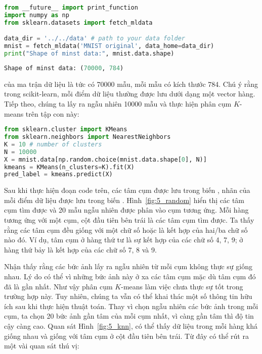 \begin{lstlisting}[language=Python]
from __future__ import print_function 
import numpy as np 
from sklearn.datasets import fetch_mldata

data_dir = '../../data' # path to your data folder 
mnist = fetch_mldata('MNIST original', data_home=data_dir)
print("Shape of minst data:", mnist.data.shape)
\end{lstlisting}
\kq 
\begin{lstlisting}[language=Python]
Shape of minst data: (70000, 784)
\end{lstlisting}
 của ma trận dữ liệu  là
 tức có 70000 mẫu, mỗi mẫu có kích thước 784. Chú ý
rằng trong scikit-learn, mỗi điểm dữ liệu thường được lưu dưới dạng một vector
hàng. Tiếp theo, chúng ta lấy ra ngẫu nhiên 10000 mẫu và thực hiện phân cụm $K$-means
trên tập con này:
\begin{lstlisting}[language=Python]
from sklearn.cluster import KMeans
from sklearn.neighbors import NearestNeighbors
K = 10 # number of clusters 
N = 10000
X = mnist.data[np.random.choice(mnist.data.shape[0], N)]
kmeans = KMeans(n_clusters=K).fit(X)
pred_label = kmeans.predict(X)
\end{lstlisting}





Sau khi thực hiện đoạn code trên, các tâm cụm được lưu trong biến
, nhãn của mỗi điểm dữ liệu được lưu
trong biến . Hình~\ref{fig:5_random} hiển thị các tâm
cụm tìm được và 20 mẫu ngẫu nhiên được phân vào cụm tương ứng. Mỗi hàng tương
ứng với một cụm, cột đầu tiên bên trái là các tâm cụm tìm được. Ta thấy rằng các
tâm cụm đều giống với một chữ số hoặc là kết hợp của hai/ba chữ số nào đó. Ví
dụ, tâm cụm ở hàng thứ tư là sự kết hợp của các chữ số 4, 7, 9; ở hàng thứ bảy là kết
hợp của các chữ số 7, 8 và 9.





Nhận thấy rằng các bức ảnh lấy ra ngẫu nhiên từ mỗi cụm không thực sự giống
nhau. Lý do có thể vì những bức ảnh này ở xa các tâm cụm mặc dù tâm cụm đó đã là
gần nhất. Như vậy phân cụm $K$-means làm việc chưa thực sự tốt trong trường hợp
này. Tuy nhiên, chúng ta vẫn có thể khai thác một số thông tin hữu ích sau khi
thực hiện thuật toán. Thay vì chọn ngẫu nhiên các bức ảnh trong mỗi cụm, ta chọn
20 bức ảnh gần tâm của mỗi cụm nhất, vì càng gần tâm thì độ tin cậy càng cao.
Quan sát Hình~\ref{fig:5_knn}, có thể thấy dữ liệu trong mỗi hàng khá giống nhau
và giống với tâm cụm ở cột đầu tiên bên trái. Từ đây có thể rút ra một vài quan
sát thú vị:

